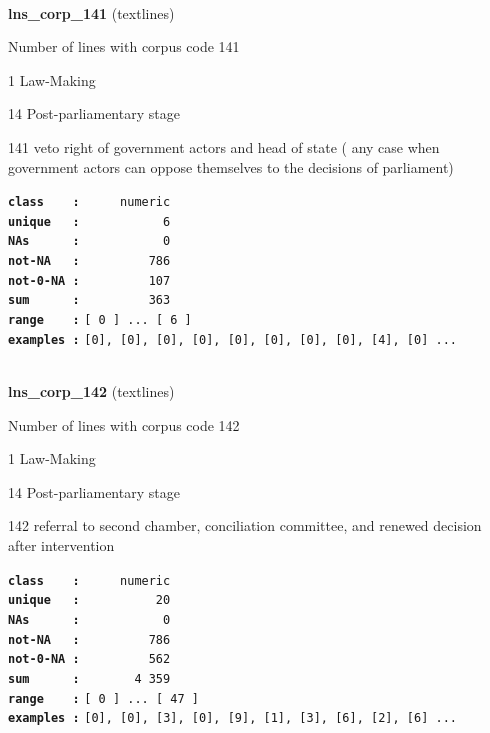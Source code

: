\documentclass[]{article}
\begin{document}
~

\textbf{lns\_corp\_141} (textlines)

Number of lines with corpus code 141

1 Law-Making

14 Post-parliamentary stage

141 veto right of government actors and head of state ( any case when
government actors can oppose themselves to the decisions of parliament)

\textbf{\texttt{class\ \ \ \ :}} \texttt{~~~~~numeric}\\
\textbf{\texttt{unique\ \ \ :}} \texttt{~~~~~~~~~~~6}\\
\textbf{\texttt{NAs\ \ \ \ \ \ :}} \texttt{~~~~~~~~~~~0}\\
\textbf{\texttt{not-NA\ \ \ :}} \texttt{~~~~~~~~~786}\\
\textbf{\texttt{not-0-NA\ :}} \texttt{~~~~~~~~~107}\\
\textbf{\texttt{sum\ \ \ \ \ \ :}} \texttt{~~~~~~~~~363}\\
\textbf{\texttt{range\ \ \ \ :}}
\texttt{{[}\ 0\ {]}\ ...\ {[}\ 6\ {]}}\\
\textbf{\texttt{examples\ :}}
\texttt{{[}0{]},\ {[}0{]},\ {[}0{]},\ {[}0{]},\ {[}0{]},\ {[}0{]},\ {[}0{]},\ {[}0{]},\ {[}4{]},\ {[}0{]}\ ...}\\

~

\textbf{lns\_corp\_142} (textlines)

Number of lines with corpus code 142

1 Law-Making

14 Post-parliamentary stage

142 referral to second chamber, conciliation committee, and renewed
decision after intervention

\textbf{\texttt{class\ \ \ \ :}} \texttt{~~~~~numeric}\\
\textbf{\texttt{unique\ \ \ :}} \texttt{~~~~~~~~~~20}\\
\textbf{\texttt{NAs\ \ \ \ \ \ :}} \texttt{~~~~~~~~~~~0}\\
\textbf{\texttt{not-NA\ \ \ :}} \texttt{~~~~~~~~~786}\\
\textbf{\texttt{not-0-NA\ :}} \texttt{~~~~~~~~~562}\\
\textbf{\texttt{sum\ \ \ \ \ \ :}} \texttt{~~~~~~~4~359}\\
\textbf{\texttt{range\ \ \ \ :}}
\texttt{{[}\ 0\ {]}\ ...\ {[}\ 47\ {]}}\\
\textbf{\texttt{examples\ :}}
\texttt{{[}0{]},\ {[}0{]},\ {[}3{]},\ {[}0{]},\ {[}9{]},\ {[}1{]},\ {[}3{]},\ {[}6{]},\ {[}2{]},\ {[}6{]}\ ...}\\
\end{document}
